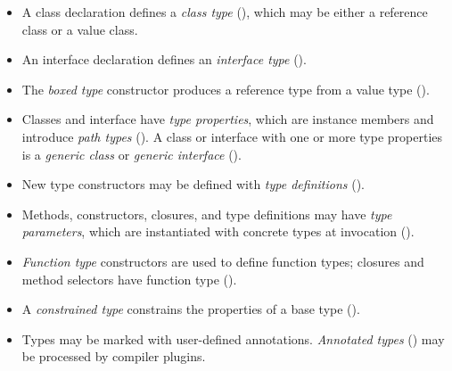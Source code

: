 \begin{itemize}
\item A class declaration defines a \emph{class type}
(), which
may be either a reference class or a value class.
\item An interface declaration defines an \emph{interface type}
().
\item The \emph{boxed type} constructor produces a reference
type from a value type ().
\item Classes and interface have \emph{type properties}, which
are instance members and introduce \emph{path types}
().
A class or interface with one or more type properties is a
\emph{generic class} or \emph{generic interface}
().
\item New type constructors may be defined with \emph{type
definitions} ().
\item Methods, constructors, closures, and type definitions may
have \emph{type parameters}, which are instantiated with
concrete types at invocation ().
\item \emph{Function type} constructors are used to define
function types; closures and method selectors have function
type ().
\item A \emph{constrained type} constrains the properties of
a base type ().
\item Types may be marked with user-defined annotations.
\emph{Annotated types} ()
may be processed by compiler plugins.
\end{itemize}

